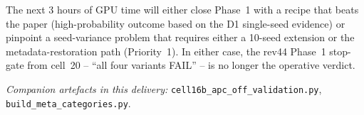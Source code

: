 \documentclass[11pt,a4paper]{article}
\begin{document}
\noindent The next 3 hours of GPU time will either close Phase~1 with a
recipe that beats the paper (high-probability outcome based on the D1
single-seed evidence) or pinpoint a seed-variance problem that requires
either a 10-seed extension or the metadata-restoration path
(Priority~1). In either case, the rev44 Phase~1 stop-gate from cell~20 --
``all four variants FAIL'' -- is no longer the operative verdict.

\bigskip
\begin{center}
\small
\textit{Companion artefacts in this delivery:}
\texttt{cell16b\_apc\_off\_validation.py},
\texttt{build\_meta\_categories.py}.
\end{center}
\end{document}

